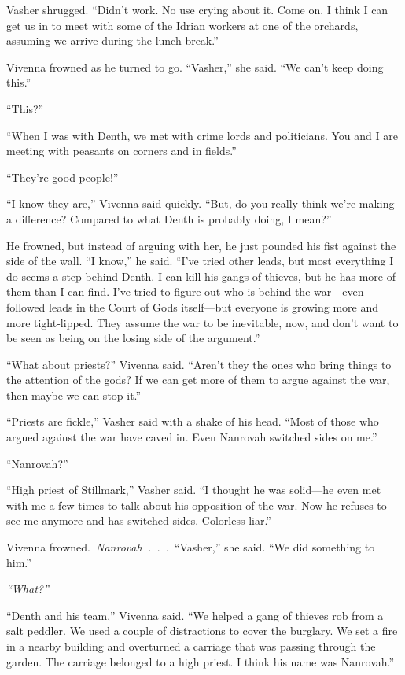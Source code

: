 Vasher shrugged. “Didn’t work. No use crying about it. Come on. I think I can get us in to meet with some of the Idrian workers at one of the orchards, assuming we arrive during the lunch break.”

Vivenna frowned as he turned to go. “Vasher,” she said. “We can’t keep doing this.”

“This?”

“When I was with Denth, we met with crime lords and politicians. You and I are meeting with peasants on corners and in fields.”

“They’re good people!”

“I know they are,” Vivenna said quickly. “But, do you really think we’re making a difference? Compared to what Denth is probably doing, I mean?”

He frowned, but instead of arguing with her, he just pounded his fist against the side of the wall. “I know,” he said. “I’ve tried other leads, but most everything I do seems a step behind Denth. I can kill his gangs of thieves, but he has more of them than I can find. I’ve tried to figure out who is behind the war—even followed leads in the Court of Gods itself—but everyone is growing more and more tight-lipped. They assume the war to be inevitable, now, and don’t want to be seen as being on the losing side of the argument.”

“What about priests?” Vivenna said. “Aren’t they the ones who bring things to the attention of the gods? If we can get more of them to argue against the war, then maybe we can stop it.”

“Priests are fickle,” Vasher said with a shake of his head. “Most of those who argued against the war have caved in. Even Nanrovah switched sides on me.”

“Nanrovah?”

“High priest of Stillmark,” Vasher said. “I thought he was solid—he even met with me a few times to talk about his opposition of the war. Now he refuses to see me anymore and has switched sides. Colorless liar.”

Vivenna frowned.~\textit{Nanrovah~.~.~.}~“Vasher,” she said. “We did something to him.”

\textit{“What?”}

“Denth and his team,” Vivenna said. “We helped a gang of thieves rob from a salt peddler. We used a couple of distractions to cover the burglary. We set a fire in a nearby building and overturned a carriage that was passing through the garden. The carriage belonged to a high priest. I think his name was Nanrovah.”

